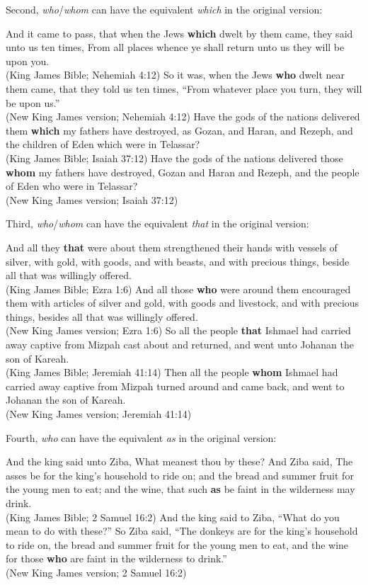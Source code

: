 Second, \textit{who}/\textit{whom} can have the equivalent \textit{which} in the original version:

\ea
\ea And it came to pass, that when the Jews \textbf{which} dwelt by them came, they said unto us ten times, From all places whence ye shall return unto us they will be upon you.\\
(King James Bible; Nehemiah 4:12)
\ex So it was, when the Jews \textbf{who} dwelt near them came, that they told us ten times, ``From whatever place you turn, they will be upon us.''\\
(New King James version; Nehemiah 4:12)
\ex Have the gods of the nations delivered them \textbf{which} my fathers have destroyed, as Gozan, and Haran, and Rezeph, and the children of Eden which were in Telassar?\\
(King James Bible; Isaiah 37:12)
\ex Have the gods of the nations delivered those \textbf{whom} my fathers have destroyed, Gozan and Haran and Rezeph, and the people of Eden who were in Telassar?\\
(New King James version; Isaiah 37:12)
\z
\z

Third, \textit{who}/\textit{whom} can have the equivalent \textit{that} in the original version:

\ea
\ea And all they \textbf{that} were about them strengthened their hands with vessels of silver, with gold, with goods, and with beasts, and with precious things, beside all that was willingly offered.\\
(King James Bible; Ezra 1:6)
\ex And all those \textbf{who} were around them encouraged them with articles of silver and gold, with goods and livestock, and with precious things, besides all that was willingly offered.\\
(New King James version; Ezra 1:6)
\ex So all the people \textbf{that} Ishmael had carried away captive from Mizpah cast about and returned, and went unto Johanan the son of Kareah.\\
(King James Bible; Jeremiah 41:14)
\ex Then all the people \textbf{whom} Ishmael had carried away captive from Mizpah turned around and came back, and went to Johanan the son of Kareah.\\
(New King James version; Jeremiah 41:14)
\z
\z

Fourth, \textit{who} can have the equivalent \textit{as} in the original version:

\ea
\ea And the king said unto Ziba, What meanest thou by these? And Ziba said, The asses be for the king's household to ride on; and the bread and summer fruit for the young men to eat; and the wine, that such \textbf{as} be faint in the wilderness may drink.\\
(King James Bible; 2 Samuel 16:2) \label{kjas}
\ex And the king said to Ziba, ``What do you mean to do with these?'' So Ziba said, ``The donkeys are for the king's household to ride on, the bread and summer fruit for the young men to eat, and the wine for those \textbf{who} are faint in the wilderness to drink.''\\
(New King James version; 2 Samuel 16:2)
\z
\z

